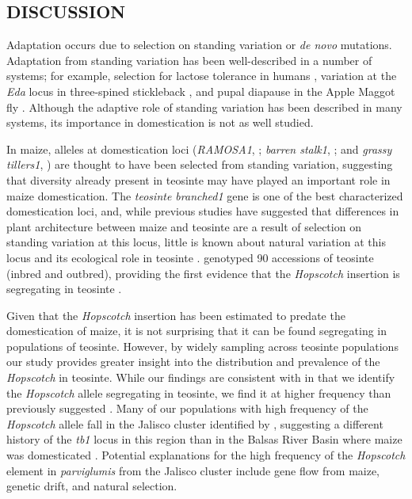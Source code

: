 \documentclass[11pt]{article}
\begin{document}
\begin{linenumbers}
\begin{flushleft}
\begin{centering}
\section*{DISCUSSION}
\end{centering}

Adaptation occurs due to selection on standing variation or \emph{de novo} mutations. Adaptation from standing variation has been well-described in a number of systems; for example, selection for lactose tolerance in humans \citep{Plantinga2012, Tishkoff2007}, variation at the \emph{Eda} locus in three-spined stickleback \citep{Kitano2008, Colosimo2005}, and pupal diapause in the Apple Maggot fly \citep{Feder2003}. Although the adaptive role of standing variation has been described in many systems, its importance in domestication is not as well studied. 

In maize, alleles at domestication loci (\emph{RAMOSA1}, \citealt{SigmonVollbrecht2010}; \emph{barren stalk1}, \citealt{Gallavotti2004}; and \emph{grassy tillers1}, \citealt{Whipple2011}) are thought to have been selected from standing variation, suggesting that diversity already present in teosinte may have played an important role in maize domestication. The \emph{teosinte branched1} gene is one of the best characterized domestication loci, and, while previous studies have suggested that differences in plant architecture between maize and teosinte are a result of selection on standing variation at this locus, little is known about natural variation at this locus and its ecological role in teosinte \citep{Clark2006, Studer2011}. \citet{Studer2011} genotyped 90 accessions of teosinte (inbred and outbred), providing the first evidence that the \emph{Hopscotch} insertion is segregating in teosinte \citep{Studer2011}. 

Given that the \emph{Hopscotch} insertion has been estimated to predate the domestication of maize, it is not surprising that it can be found segregating in populations of teosinte. However, by widely sampling across teosinte populations our study provides greater insight into the distribution and prevalence of the \emph{Hopscotch} in teosinte. While our findings are consistent with \citet{Studer2011} in that we identify the \emph{Hopscotch} allele segregating in teosinte, we find it at higher frequency than previously suggested \citep{Studer2011}. Many of our populations with high frequency of the \emph{Hopscotch} allele fall in the Jalisco cluster identified by \citet{Fukunaga2005}, suggesting a different history of the \emph{tb1} locus in this region than in the Balsas River Basin where maize was domesticated \citep{Matsuoka2002}. Potential explanations for the high frequency of the \emph{Hopscotch} element in \emph{parviglumis} from the Jalisco cluster include gene flow from maize, genetic drift, and natural selection. 


\end{flushleft}
\end{linenumbers}
\end{document}
